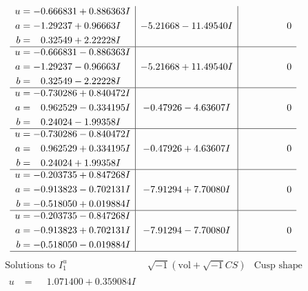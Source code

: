 \documentclass[1p]{elsarticle_modified}
\theoremstyle{definition}
\newcommand{\I}{\sqrt{-1}}
\begin{document}
$$\begin{array}{c|c|c}
\begin{aligned}
u &= -0.666831 + 0.886363 I \\
a &= -1.29237 + 0.96663 I \\
b &= \phantom{-}0.32549 + 2.22228 I\end{aligned}
 & -5.21668 - 11.49540 I & \phantom{-0.000000 } 0 \\ \hline\begin{aligned}
u &= -0.666831 - 0.886363 I \\
a &= -1.29237 - 0.96663 I \\
b &= \phantom{-}0.32549 - 2.22228 I\end{aligned}
 & -5.21668 + 11.49540 I & \phantom{-0.000000 } 0 \\ \hline\begin{aligned}
u &= -0.730286 + 0.840472 I \\
a &= \phantom{-}0.962529 - 0.334195 I \\
b &= \phantom{-}0.24024 - 1.99358 I\end{aligned}
 & -0.47926 - 4.63607 I & \phantom{-0.000000 } 0 \\ \hline\begin{aligned}
u &= -0.730286 - 0.840472 I \\
a &= \phantom{-}0.962529 + 0.334195 I \\
b &= \phantom{-}0.24024 + 1.99358 I\end{aligned}
 & -0.47926 + 4.63607 I & \phantom{-0.000000 } 0 \\ \hline\begin{aligned}
u &= -0.203735 + 0.847268 I \\
a &= -0.913823 - 0.702131 I \\
b &= -0.518050 + 0.019884 I\end{aligned}
 & -7.91294 + 7.70080 I & \phantom{-0.000000 } 0 \\ \hline\begin{aligned}
u &= -0.203735 - 0.847268 I \\
a &= -0.913823 + 0.702131 I \\
b &= -0.518050 - 0.019884 I\end{aligned}
 & -7.91294 - 7.70080 I & \phantom{-0.000000 } 0\\
 \hline 
 \end{array}$$\newpage$$\begin{array}{c|c|c}  
\text{Solutions to }I^u_{1}& \I (\text{vol} + \sqrt{-1}CS) & \text{Cusp shape}\\
 \hline 
\begin{aligned}
u &= \phantom{-}1.071400 + 0.359084 I \\

\end{aligned}
\end{array}$$
\end{document}

